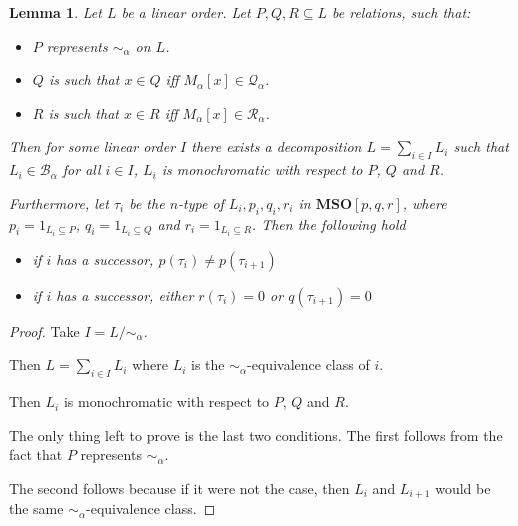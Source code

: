 \documentclass{article}
\newtheorem{lemma}{Lemma}
\newcommand{\mso}{\mathbf{MSO}}
\begin{document}
\begin{lemma}
  Let $L$ be a linear order. Let $P, Q, R \subseteq L$ be relations, such that:

  \begin{itemize}
    \item $P$ represents $\sim_{\alpha}$ on $L$.
    \item $Q$ is such that $x \in Q$ iff $M_{\alpha}[x] \in \mathcal{Q}_{\alpha}$.
    \item $R$ is such that $x \in R$ iff $M_{\alpha}[x] \in \mathcal{R}_{\alpha}$.
  \end{itemize}

  Then for some linear order $I$ there exists a decomposition
  $L = \sum_{i \in I} L_i$ such that $L_i \in \mathcal{B}_{\alpha}$ for all $i \in I$,
  $L_i$ is monochromatic with respect to $P$, $Q$ and $R$.

  Furthermore, let $\tau_i$ be the $n$-type of $L_i, p_i, q_i, r_i$ in $\mso[p, q, r]$,
  where $p_i = 1_{L_i \subseteq P}$, $q_i = 1_{L_i \subseteq Q}$ and $r_i = 1_{L_i \subseteq R}$.
  Then the following hold
  \begin{itemize}
    \item if $i$ has a successor, $p(\tau_i) \ne p(\tau_{i+1})$
    \item if $i$ has a successor, either $r(\tau_i) = 0$ or $q(\tau_{i+1}) = 0$
  \end{itemize}
\end{lemma}
\begin{proof}
  Take $I = L / \sim_{\alpha}$.

  Then $L = \sum_{i \in I} L_i$ where $L_i$ is the $\sim_{\alpha}$-equivalence class of $i$.

  Then $L_i$ is monochromatic with respect to $P$, $Q$ and $R$.

  The only thing left to prove is the last two conditions. The first follows from
  the fact that $P$ represents $\sim_{\alpha}$.

  The second follows because if it were not the case, then $L_i$ and $L_{i+1}$ would
  be the same $\sim_{\alpha}$-equivalence class.
\end{proof}
\end{document}
